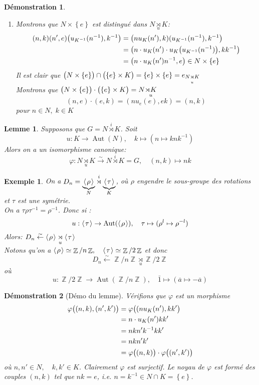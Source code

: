 \documentclass[a4paper, oneside]{report}
\theoremstyle{break}
\newtheorem{lemme}[thm]{Lemme}
\newtheorem{exemple}[thm]{Exemple}
\newtheorem*{demonstration}{Démonstration}
\newcommand{\fong}{\overset{\sim}{\rightarrow}}
\DeclareMathOperator{\Z}{\mathbb{Z}}
\DeclarePairedDelimiter\ens{\left\{ }{\right\} }%
\DeclarePairedDelimiter\pa{\big(}{\big)}%
\DeclareMathOperator{\Aut}{Aut}
\renewcommand{\ens}[1]{\left\{ #1 \right\} }%
\newcommand{\pro}[1]{\langle\hspace{0.1em}#1\hspace{0.1em}\rangle}
\newcommand{\us}{\underset}
\newcommand{\os}{\overset}
\newcommand{\ol}{\overline}
\newcommand{\ub}{\underbrace}
\newcommand{\Pa}{\pa}
\newcommand{\para}{\pa}
\begin{document}
\begin{demonstration}
\begin{enumerate}
\item  Montrons que $N \times \ens{e}$ est distingué dans $N \us{u}{\rtimes} K$:
\begin{align*}
(n, k)(n', e)\pa{u_{K^{-1}}(n^{-1}), k ^{-1}} &= \pa{n u_K(n'), k)(u_{K^{-1}}(n^{-1}), k^{-1}}
\\
&= \Pa{n \cdot u_K(n') \cdot u_K\pa{u_{K^{-1}}(n^{-1})}, kk^{-1}}
\\
&= \pa{n \cdot u_K(n')n^{-1}, e} \in N \times \ens{e}
\end{align*}
Il est clair que $\para{N \times \ens{e}} \cap \para{\ens{e} \times K} = \ens{e} \times \ens{e} = e_{N \us{u}{\rtimes} K}$\\
Montrons que $\para{N \times \ens{e}} \cdot \para{\ens{e} \times K} = N \us{u}{\rtimes K}$
\[
(n, e) \cdot (e, k) = (n u_e(e), ek) = (n,k)
\]
pour $n \in N, \; k \in K$
\end{enumerate}
\end{demonstration}

\begin{lemme}
Supposons que $G = N \os{i}{\rtimes} K$. Soit
\[
u : K \rightarrow \Aut(N), \quad	k \mapsto (n \mapsto k n k^{-1})
\]
Alors on a un isomorphisme canonique:
\[
\varphi : N \us{u}{\rtimes} K \fong N \os{i}{\rtimes} K = G, \quad	(n,k) \mapsto nk
\]
\end{lemme}

\begin{exemple}
On a $D_n = \ub{\pro{\rho}}_{N} \os{i}{\rtimes} \ub{\pro{\tau}}_{K}$, où $\rho$ engendre le sous-groupe des rotations et $\tau$ est une symétrie.\\
On a $\tau\rho\tau^{-1} = \rho^{-1}$.
Donc si :
\[
u : \pro{\tau} \rightarrow \Aut(\pro{\rho}), \quad	\tau \mapsto (\rho^l \mapsto \rho^{-l})
\]
Alors: $D_n \os{\sim}{\leftarrow} \pro{\rho} \us{u}{\rtimes} \pro{\tau}$\\
Notons qu'on a $\pro{\rho} \simeq \Z/n\Z, \quad	\pro{\tau} \simeq \Z/2\Z$ et donc 
\[
D_n \os{\sim}{\leftarrow} \Z/n\Z \us{u}{\rtimes} \Z/2\Z
\]
où
\[
u : \Z/2\Z \rightarrow \Aut(\Z/n\Z), \quad	\bar{1} \mapsto (\ol{a} \mapsto -\ol{a})
\]
\end{exemple}

\begin{demonstration}[Démo du lemme]
Vérifions que $\varphi$ est un morphisme
\begin{align*}
\varphi \pa{(n, k), (n', k')} &= \varphi\pa{(n u_K(n'), kk'} 
\\
&= n \cdot u_K(n') kk' 
\\
&= nkn'k^{-1}kk' 
\\
&= nkn'k'
\\
&= \varphi\pa{(n,k)} \cdot \varphi\pa{(n', k')}
\end{align*}
où $n, n' \in N, \quad k, k' \in K$. Clairement $\varphi$ est surjectif. Le noyau de $\varphi$ est formé des couples $(n, k)$ tel que $nk = e$, i.e. $n = k^{-1} \in N \cap K = \ens{e}$.
\end{demonstration}
\end{document}
